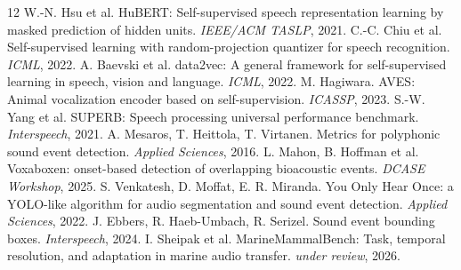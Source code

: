 \documentclass[10pt,twocolumn]{article}
\begin{document}

\begin{thebibliography}{12}
 W.-N. Hsu et al. HuBERT: Self-supervised speech representation learning by masked prediction of hidden units. \emph{IEEE/ACM TASLP}, 2021.
 C.-C. Chiu et al. Self-supervised learning with random-projection quantizer for speech recognition. \emph{ICML}, 2022.
 A. Baevski et al. data2vec: A general framework for self-supervised learning in speech, vision and language. \emph{ICML}, 2022.
 M. Hagiwara. AVES: Animal vocalization encoder based on self-supervision. \emph{ICASSP}, 2023.
 S.-W. Yang et al. SUPERB: Speech processing universal performance benchmark. \emph{Interspeech}, 2021.
 A. Mesaros, T. Heittola, T. Virtanen. Metrics for polyphonic sound event detection. \emph{Applied Sciences}, 2016.
 L. Mahon, B. Hoffman et al. Voxaboxen: onset-based detection of overlapping bioacoustic events. \emph{DCASE Workshop}, 2025.
 S. Venkatesh, D. Moffat, E. R. Miranda. You Only Hear Once: a YOLO-like algorithm for audio segmentation and sound event detection. \emph{Applied Sciences}, 2022.
 J. Ebbers, R. Haeb-Umbach, R. Serizel. Sound event bounding boxes. \emph{Interspeech}, 2024.
 I. Sheipak et al. MarineMammalBench: Task, temporal resolution, and adaptation in marine audio transfer. \emph{under review}, 2026.
\end{thebibliography}
\end{document}
